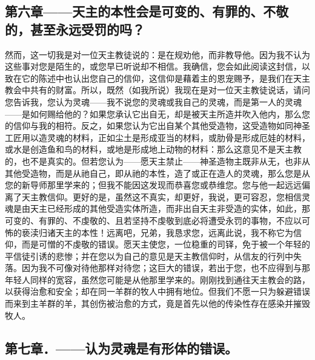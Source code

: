 
\subsection{第六章——天主的本性会是可变的、有罪的、不敬的，甚至永远受罚的吗？}

然而，这一切我是对一位天主教徒说的：是在规劝他，而非教导他。因为我不认为这些事对您是陌生的，或您早已听说却不相信。我确信，您会如此阅读这封信，以致在它的陈述中也认出您自己的信仰，这信仰是藉着主的恩宠赐予，是我们在天主教会中共有的财富。所以，既然（如我所说）我现在是对一位天主教徒说话，请问您告诉我，您认为灵魂——我不说您的灵魂或我自己的灵魂，而是第一人的灵魂——是如何赐给他的？如果您承认它出自无，却是被天主所造并吹入他内，那么您的信仰与我的相符。反之，如果您认为它出自某个其他受造物，这受造物如同神圣工匠用以造灵魂的材料，正如尘土是形成亚当的材料，或肋骨是形成厄娃的材料，或水是创造鱼和鸟的材料，或地是形成地上动物的材料：那么这意见不是天主教的，也不是真实的。但若您认为——愿天主禁止——神圣造物主既非从无，也非从其他受造物，而是从祂自己，即从祂的本性，造了或正在造人的灵魂，那么您是从您的新导师那里学来的；但我不能因这发现而恭喜您或恭维您。您与他一起远远偏离了天主教信仰。更好的是，虽然这不真实，却更好，我说，更可容忍，您相信灵魂是由天主已经形成的其他受造实体所造，而非出自天主非受造的实体，如此，那可变的、有罪的、不虔敬的、且若坚持不虔敬到底必将遭受永罚的事物，不应以可怖的亵渎归诸天主的本性！远离吧，兄弟，我恳求您，远离此说，我不称它为信仰，而是可憎的不虔敬的错误。愿天主使您，一位稳重的司铎，免于被一个年轻的平信徒引诱的悲惨；并在您以为自己的意见是天主教信仰时，从信友的行列中失落。因为我不可像对待他那样对待您；这巨大的错误，若出于您，也不应得到与那年轻人同样的宽容，虽然您可能是从他那里学来的。刚刚找到通往天主教会的路，以获得治愈和安全；却在同一羊群的牧人中拥有地位。但我们不愿一只为躲避错误而来到主羊群的羊，其创伤被治愈的方式，竟是首先以他的传染性存在感染并摧毁牧人。\par


\subsection{第七章．——认为灵魂是有形体的错误。}

